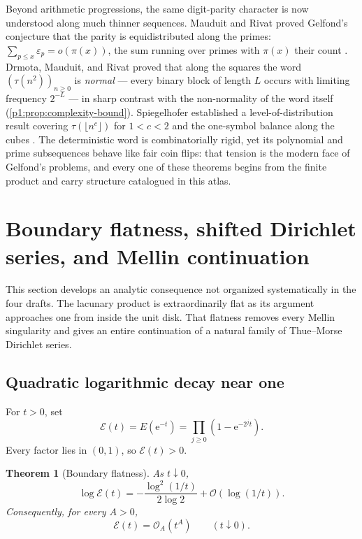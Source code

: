 \documentclass[11pt,oneside]{article}
\numberwithin{equation}{section}
\newtheorem{theorem}{Theorem}[section]
\theoremstyle{definition}
\theoremstyle{remark}
\newcommand{\e}{\mathrm e}
\newcommand{\bigO}{\mathcal O}
\newcommand{\smallo}{o}
\newcommand{\eps}{\varepsilon}
\begin{document}
Beyond arithmetic progressions, the same digit-parity character is now
understood along much thinner sequences.  Mauduit and Rivat proved
Gelfond's conjecture that the parity is equidistributed along the primes:
\(\sum_{p\le x}\eps_p=\smallo(\pi(x))\), the sum running over primes with
\(\pi(x)\) their count \cite{p1:mauduitRivat2010}.  Drmota, Mauduit, and Rivat
proved that along the squares the word
\((\tau(n^2))_{n\ge0}\) is \emph{normal} --- every binary block of length
\(L\) occurs with limiting frequency \(2^{-L}\)
\cite{p1:drmotaMauduitRivat2019} --- in sharp contrast with the non-normality
of the word itself (\cref{p1:prop:complexity-bound}).  Spiegelhofer
established a level-of-distribution result covering
\(\tau(\lfloor n^c\rfloor)\) for \(1<c<2\) \cite{p1:spiegelhofer2020} and the
one-symbol balance along the cubes \cite{p1:spiegelhofer2023}.  The
deterministic word is combinatorially rigid, yet its polynomial and prime
subsequences behave like fair coin flips: that tension is the modern face
of Gelfond's problems, and every one of these theorems begins from the
finite product and carry structure catalogued in this atlas.

\section[Mellin--Dirichlet continuation]{Boundary flatness, shifted Dirichlet series, and Mellin continuation}
\label{p1:sec:dirichlet-mellin}

This section develops an analytic consequence not organized systematically in
the four drafts.  The lacunary product is extraordinarily flat as its argument
approaches one from inside the unit disk.  That flatness removes every Mellin
singularity and gives an entire continuation of a natural family of
Thue--Morse Dirichlet series.

\subsection{Quadratic logarithmic decay near one}

For \(t>0\), set
\begin{equation}
  \mathcal E(t)=E(\e^{-t})
  =\prod_{j\ge0}(1-\e^{-2^jt}).
  \label{p1:eq:E-caligraphic}
\end{equation}
Every factor lies in \((0,1)\), so \(\mathcal E(t)>0\).

\begin{theorem}[Boundary flatness]
\label{p1:thm:boundary-flatness}
As \(t\downarrow0\),
\begin{equation}
  \boxed{
  \log\mathcal E(t)
  =-\frac{\log^2(1/t)}{2\log2}
   +\bigO(\log(1/t)).}
  \label{p1:eq:boundary-log-asymptotic}
\end{equation}
Consequently, for every \(A>0\),
\begin{equation}
  \mathcal E(t)=\bigO_A(t^A)
  \qquad(t\downarrow0).
  \label{p1:eq:superpolynomial-flatness}
\end{equation}
\end{theorem}
\end{document}
